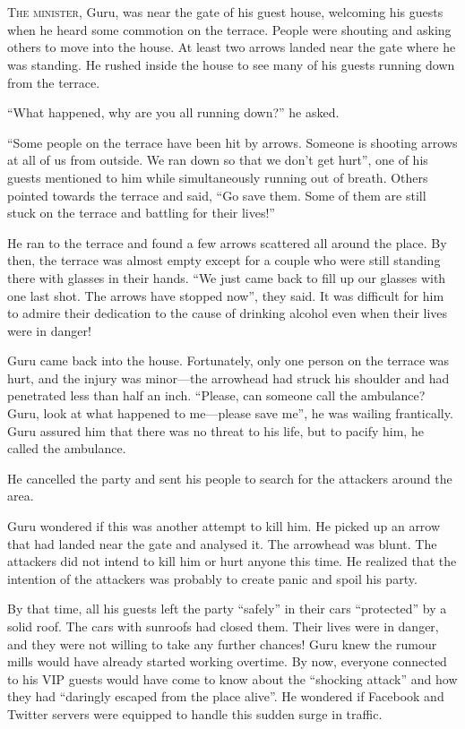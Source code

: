 \chapter{}

\lettrine{T}{he minister}, Guru, was near the gate of his guest house, welcoming his guests
when he heard some commotion on the terrace. People were shouting and asking
others to move into the house. At least two arrows landed near the gate where he
was standing. He rushed inside the house to see many of his guests running down
from the terrace.

“What happened, why are you all running down?” he asked.

“Some people on the terrace have been hit by arrows. Someone is shooting arrows
at all of us from outside. We ran down so that we don't get hurt”, one of his
guests mentioned to him while simultaneously running out of breath. Others
pointed towards the terrace and said, “Go save them. Some of them are still
stuck on the terrace and battling for their lives!”

He ran to the terrace and found a few arrows scattered all around the place. By
then, the terrace was almost empty except for a couple who were still standing there
with glasses in their hands. “We just came back to fill up our glasses with one
last shot. The arrows have stopped now”, they said. It was difficult for him to
admire their dedication to the cause of drinking alcohol even when their lives
were in danger!

Guru came back into the house. Fortunately, only one person on the terrace was
hurt, and the injury was minor—the arrowhead had struck his shoulder and
had penetrated less than half an inch. “Please, can someone call the
ambulance? Guru, look at what happened to me—please save me”, he was wailing
frantically. Guru assured him that there was no threat to his life, but to pacify
him, he called the ambulance.

He cancelled the party and sent his people to search for the attackers around the
area.

Guru wondered if this was another attempt to kill him. He picked up an arrow
that had landed near the gate and analysed it. The arrowhead was blunt. The
attackers did not intend to kill him or hurt anyone this time. He realized that
the intention of the attackers was probably to create panic and spoil his party.

By that time, all his guests left the party “safely” in their cars “protected” by
a solid roof. The cars with sunroofs had closed them. Their lives were
in danger, and they were not willing to take any further chances! Guru knew the
rumour mills would have already started working overtime. By now, everyone
connected to his VIP guests would have come to know about the “shocking attack”
and how they had “daringly escaped from the place alive”. He wondered if
Facebook and Twitter servers were equipped to handle this sudden surge in
traffic.

